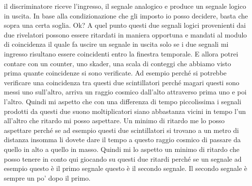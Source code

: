 il discriminatore riceve l'ingresso, il segnale analogico e produce un segnale logico in uscita. In base alla condizionazione che gli imposto io posso decidere, basta che sopra una certa soglia. Ok? A quel punto questi due segnali logici provenienti dai due rivelatori possono essere ritardati in maniera opportuna e mandati al modulo di coincidenza il quale fa uscire un segnale in uscita solo se i due segnali mi ingresso risultano essere coincidenti entro la finestra temporale. E allora potrei contare con un counter, uno skader, una scala di conteggi che abbiamo visto prima quante coincidenze si sono verificate. Ad esempio perché si potrebbe verificare una coincidenza tra questi due scintillatori perché magari questi sono messi uno sull'altro, arriva un raggio cosmico dall'alto attraverso prima uno e poi l'altro. Quindi mi aspetto che con una differenza di tempo piccolissima i segnali prodotti da questi due suono moltiplicatori siano abbastanza vicini in tempo l'un all'altro che ritardo mi posso aspettare. Un minimo di ritardo me lo posso aspettare perché se ad esempio questi due scintillatori si trovano a un metro di distanza insomma li dovete dare il tempo a questo raggio cosmico di passare da quello in alto a quello in masso. Quindi mi lo aspetto un minimo di ritardo che posso tenere in conto qui giocando su questi due ritardi perché se un segnale ad esempio questo è il primo segnale questo è il secondo segnale. Il secondo segnale è sempre un po' dopo il primo.

